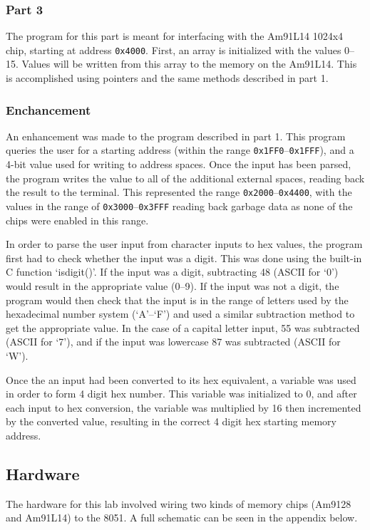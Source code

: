 \documentclass[12pt]{article}
\begin{document}
\subsubsection{Part 3}
The program for this part is meant for interfacing with the Am91L14 1024x4 chip, starting at address \texttt{0x4000}. First, an array is initialized with the values 0--15. Values will be written from this array to the memory on the Am91L14. This is accomplished using pointers and the same methods described in part 1. 

\subsubsection{Enchancement}
An enhancement was made to the program described in part 1. This program queries the user for a starting address (within the range \texttt{0x1FF0}--\texttt{0x1FFF}), and a 4-bit value used for writing to address spaces. Once the input has been parsed, the program writes the value to all of the additional external spaces, reading back the result to the terminal. This represented the range \texttt{0x2000}--\texttt{0x4400}, with the values in the range of \texttt{0x3000}--\texttt{0x3FFF} reading back garbage data as none of the chips were enabled in this range. 

In order to parse the user input from character inputs to hex values, the program first had to check whether the input was a digit. This was done using the built-in C function `isdigit()'. If the input was a digit, subtracting 48 (ASCII for `0') would result in the appropriate value (0--9). If the input was not a digit, the program would then check that the input is in the range of letters used by the hexadecimal number system (`A'--`F') and used a similar subtraction method to get the appropriate value. In the case of a capital letter input, 55 was subtracted (ASCII for `7'), and if the input was lowercase 87 was subtracted (ASCII for `W').

Once the an input had been converted to its hex equivalent, a variable was used in order to form 4 digit hex number. This variable was initialized to 0, and after each input to hex conversion, the variable was multiplied by 16 then incremented by the converted value, resulting in the correct 4 digit hex starting memory address. 

\subsection{Hardware}
The hardware for this lab involved wiring two kinds of memory chips (Am9128 and Am91L14) to the 8051. A full schematic can be seen in the appendix below.
\end{document}
